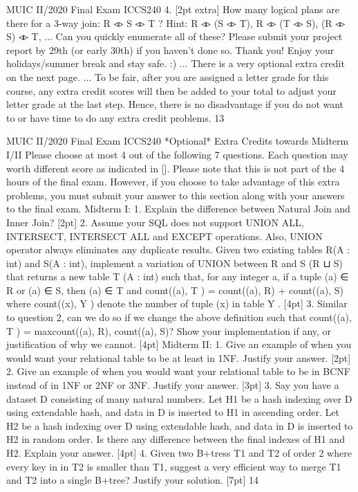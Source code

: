 \documentclass[a4paper, 11pt]{article}
\begin{document}
MUIC II/2020 Final Exam ICCS240
4. [2pt extra] How many logical plans are there for a 3-way join: R ◃▹ S ◃▹ T ?
Hint: R ◃▹ (S ◃▹ T), R ◃▹ (T ◃▹ S), (R ◃▹ S) ◃▹ T, ... Can you quickly enumerate all of these?
      Please submit your project report by 29th (or early 30th) if you haven’t done so. Thank you! Enjoy your holidays/summer break and stay safe. :)
... There is a very optional extra credit on the next page. ...
To be fair, after you are assigned a letter grade for this course, any extra credit scores will then be added to your total to adjust your letter grade at the last step. Hence, there is no disadvantage if you do not want to or have time to do any extra credit problems.
13

MUIC II/2020 Final Exam ICCS240
*Optional* Extra Credits towards Midterm I/II Please choose at most 4 out of the following 7 questions.
Each question may worth different score as indicated in []. Please note that this is not part of the 4 hours of the final exam. However, if you choose to take advantage of this extra problems, you must submit your answer to this section along with your answers to the final exam.
Midterm I:
1. Explain the difference between Natural Join and Inner Join? [2pt]
2. Assume your SQL does not support UNION ALL, INTERSECT, INTERSECT ALL and EXCEPT operations. Also, UNION operator always eliminates any duplicate results.
Given two existing tables R(A : int) and S(A : int), implement a variation of UNION between R and S (R ⊔ S) that returns a new table T (A : int) such that, for any integer a, if a tuple (a) ∈ R or (a) ∈ S, then (a) ∈ T and count((a), T ) = count((a), R) + count((a), S) where count((x), Y ) denote the number of tuple (x) in table Y . [4pt]
3. Similar to question 2, can we do so if we change the above definition such that
count((a), T ) = max{count((a), R), count((a), S)}? Show your implementation if any, or justification of why we cannot. [4pt]
Midterm II:
1. Give an example of when you would want your relational table to be at least in 1NF. Justify
your answer. [2pt]
2. Give an example of when you would want your relational table to be in BCNF instead of in 1NF or 2NF or 3NF. Justify your answer. [3pt]
3. Say you have a dataset D consisting of many natural numbers. Let H1 be a hash indexing over D using extendable hash, and data in D is inserted to H1 in ascending order. Let H2 be a hash indexing over D using extendable hash, and data in D is inserted to H2 in random order. Is there any difference between the final indexes of H1 and H2. Explain your answer. [4pt]
4. Given two B+tress T1 and T2 of order 2 where every key in in T2 is smaller than T1, suggest a very efficient way to merge T1 and T2 into a single B+tree? Justify your solution. [7pt]
 14
\end{document}
